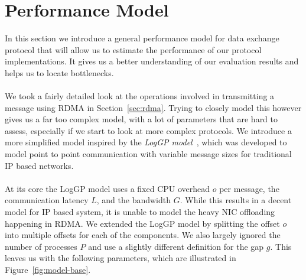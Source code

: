 \section{Performance Model}\label{sec:perf-model} \label{sec:model}
In this section we introduce a general performance model for data exchange protocol that will allow us to estimate the 
performance of our protocol implementations. It gives us a better understanding of our evaluation results and helps us 
to locate bottlenecks.

\paragraph{}We took a fairly detailed look at the operations involved in transmitting a message using RDMA in Section~\ref{sec:rdma}.
Trying to closely model this however gives us a far too complex model, with a lot of parameters that are hard to assess,
especially if we start to look at more complex protocols. We introduce a more simplified model inspired by the  
\emph{LogGP model}~\cite{loggp}, which was developed  to model point to point communication with variable message sizes for 
traditional IP based networks.

\paragraph{} At its core the LogGP model uses a fixed CPU overhead $o$ per message, the communication latency $L$, and 
the bandwidth $G$. While this results in a decent model for IP based system, it is unable to model the heavy NIC offloading 
happening in RDMA. We extended the LogGP model by splitting the offset $o$ into multiple offsets for each of the components.
We also largely ignored the number of processes $P$ and use a slightly different definition for the gap $g$. This leaves 
us with the following parameters, which are illustrated in Figure~\ref{fig:model-base}.

